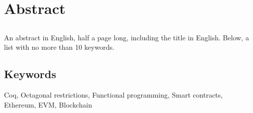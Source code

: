 \chapter*{Abstract}

\section*{\tituloPortadaEngVal}

An abstract in English, half a page long, including the title in English. Below, a list with no more than 10 keywords.


\section*{Keywords}

\noindent Coq, Octagonal restrictions, Functional programming, Smart contracts, Ethereum, EVM, Blockchain



